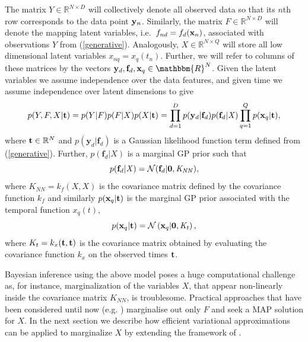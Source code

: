 \documentclass{article} %
\begin{document}
The matrix $\mathit{Y} \in \mathbb{R}^{N \times D}$ will collectively
denote all observed data so that its $n$th row corresponds to the data
point $\mathbf{y}_n$. Similarly, the matrix $F \in \mathbb{R}^{N \times D}$
will denote the mapping latent variables, i.e.\ $f_{nd} =f_d(\mathbf{x}_n)$,
associated with observations $Y$ from (\ref{generative}). Analogously,
$X \in \mathbb{R}^{N \times Q}$ will store all low dimensional latent
variables $x_{nq}=x_q(t_n)$. Further, we will refer to columns of
these matrices by the vectors $\bfy_d,\bff_d, \bfx_q \in
\mathbbm{R}^N$. Given the latent variables we assume independence over
the data features, and given time we assume independence over latent
dimensions to give
\begin{equation}
\label{joint}
p(Y,F, X | \mathbf{t}) = p(Y|F) p(F|X) p(X |\mathbf{t})= 
 \prod_{d=1}^D  p(\mathbf{y}_d | \mathbf{f}_d) p(\mathbf{f}_d |
 \mathit{X}) \prod_{q=1}^Q p(\mathbf{x}_q | \mathbf{t}),
\end{equation}
where $\mathbf{t} \in \mathbb{R}^N$ and $p(\mathbf{y}_d | \mathbf{f}_d)$ 
is a Gaussian likelihood function term defined from  (\ref{generative}). 
Further, $p(\mathbf{f}_d | \mathit{X})$ is a marginal GP prior 
such that 
\begin{equation}
\label{priorF}
p(\mathbf{f}_d | \mathit{X}) = \mathcal{N}(\mathbf{f}_d |\mathbf{0}, \mathit{K_{NN}}),
\end{equation}
where $\mathit{K}_{NN}= \mathit{k}_f(X,X)$ is the covariance matrix
defined by the covariance function $\mathit{k}_f$ and similarly 
$p(\mathbf{x}_q|\mathbf{t})$ is the marginal GP prior associated with 
the temporal function $x_q(t)$,  
\begin{equation}
p(\mathbf{x}_q|\mathbf{t}) = \mathcal{N} \left( \mathbf{x}_q | \mathbf{0},
  \mathit{K_t} \right),
\label{priorXgivenT}
\end{equation}
where $K_t = k_x(\mathbf{t},\mathbf{t})$ is the covariance matrix obtained by
evaluating the covariance function $\mathit{k}_x$ on the observed times
$\mathbf{t}$. 
 
Bayesian inference using the above model poses a huge computational
challenge as, for instance, marginalization of the variables $X$, that
appear non-linearly inside the covariance matrix $K_{NN}$, is
troublesome. Practical approaches that have been considered until now
(e.g. \cite{hgplvm, GPDM}) marginalise out only $F$ and seek a MAP
solution for $X$.
%
 In the next section we describe how efficient variational 
approximations can be applied to marginalize $X$ by extending the 
framework of \cite{BayesianGPLVM}.
\end{document}
